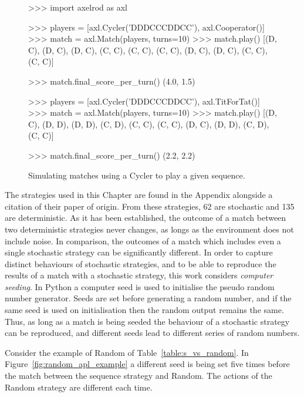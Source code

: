 \begin{figure}[!htbp]
    \begin{usagepy}
>>> import axelrod as axl

>>> players = [axl.Cycler('DDDCCCDDCC'), axl.Cooperator()]
>>> match = axl.Match(players, turns=10)
>>> match.play()
[(D, C),
 (D, C),
 (D, C),
 (C, C),
 (C, C),
 (C, C),
 (D, C),
 (D, C),
 (C, C),
 (C, C)]

>>> match.final_score_per_turn()
(4.0, 1.5)

>>> players = [axl.Cycler('DDDCCCDDCC'), axl.TitForTat()]
>>> match = axl.Match(players, turns=10)
>>> match.play()
[(D, C),
 (D, D),
 (D, D),
 (C, D),
 (C, C),
 (C, C),
 (D, C),
 (D, D),
 (C, D),
 (C, C)]

 >>> match.final_score_per_turn()
 (2.2, 2.2)
    \end{usagepy}
\caption{Simulating matches using a Cycler to play a given sequence.}\label{fig:apl_simulations_cycler}
\end{figure}

The \numberofstrategiesbestsequences strategies used in this Chapter are found
in the Appendix alongside a citation of their paper of origin.
From these \numberofstrategiesbestsequences strategies, 62 are stochastic and
135 are deterministic. As it has been established, the outcome of a match
between two deterministic strategies never changes, as longs as the environment
does not include noise. In comparison, the outcomes of a match which includes even a single
stochastic strategy can be significantly different. In order to
capture distinct behaviours of stochastic strategies, and to be able to
reproduce the results of a match with a stochastic strategy, this work considers
\textit{computer seeding}. In Python a computer seed is used to initialise the
pseudo random number generator. Seeds are set before generating a random number,
and if the same seed is used on initialisation then the random output remains
the same. Thus, as long as a match is being seeded the behaviour of a stochastic
strategy can be reproduced, and different seeds lead to different series of
random numbers.

Consider the example of Random of Table~\ref{table:s_vs_random}. In
Figure~\ref{fig:random_apl_example} a different seed is being set five times
before the match between the sequence strategy and Random. The actions of the
Random strategy are different each time.

